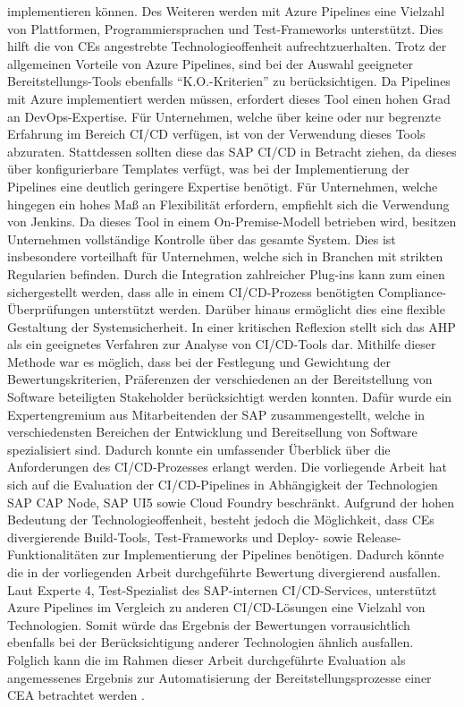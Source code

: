implementieren können. Des Weiteren werden mit Azure Pipelines eine Vielzahl von Plattformen, Programmiersprachen und Test-Frameworks unterstützt. Dies hilft die von CEs angestrebte Technologieoffenheit aufrechtzuerhalten. Trotz der allgemeinen Vorteile von Azure Pipelines, sind bei der Auswahl geeigneter Bereitstellungs-Tools ebenfalls \enquote{K.O.-Kriterien} zu berücksichtigen. Da Pipelines mit Azure implementiert werden müssen, erfordert dieses Tool einen hohen Grad an DevOps-Expertise. Für Unternehmen, welche über keine oder nur begrenzte Erfahrung im Bereich CI/CD verfügen, ist von der Verwendung dieses Tools abzuraten. Stattdessen sollten diese das SAP CI/CD in Betracht ziehen, da dieses über konfigurierbare Templates verfügt, was bei der Implementierung der Pipelines eine deutlich geringere Expertise benötigt. Für Unternehmen, welche hingegen ein hohes Maß an Flexibilität erfordern, empfiehlt sich die Verwendung von Jenkins. Da dieses Tool in einem On-Premise-Modell betrieben wird, besitzen Unternehmen vollständige Kontrolle über das gesamte System. Dies ist insbesondere vorteilhaft für Unternehmen, welche sich in Branchen mit strikten Regularien befinden. Durch die Integration zahlreicher Plug-ins kann zum einen sichergestellt werden, dass alle in einem CI/CD-Prozess benötigten Compliance-Überprüfungen unterstützt werden. Darüber hinaus ermöglicht dies eine flexible Gestaltung der Systemsicherheit. In einer kritischen Reflexion stellt sich das AHP als ein geeignetes Verfahren zur Analyse von CI/CD-Tools dar. Mithilfe dieser Methode war es möglich, dass bei der Festlegung und Gewichtung der Bewertungskriterien, Präferenzen der verschiedenen an der Bereitstellung von Software beteiligten Stakeholder berücksichtigt werden konnten. Dafür wurde ein Expertengremium aus Mitarbeitenden der SAP zusammengestellt, welche in verschiedensten Bereichen der Entwicklung und Bereitsellung von Software spezialisiert sind. Dadurch konnte ein umfassender Überblick über die Anforderungen des CI/CD-Prozesses erlangt werden. Die vorliegende Arbeit hat sich auf die Evaluation der CI/CD-Pipelines in Abhängigkeit der Technologien SAP CAP Node, SAP UI5 sowie Cloud Foundry beschränkt. Aufgrund der hohen Bedeutung der Technologieoffenheit, besteht jedoch die Möglichkeit, dass CEs divergierende Build-Tools, Test-Frameworks und Deploy- sowie Release-Funktionalitäten zur Implementierung der Pipelines benötigen. Dadurch könnte die in der vorliegenden Arbeit durchgeführte Bewertung divergierend ausfallen. Laut Experte 4, Test-Spezialist des SAP-internen CI/CD-Services, unterstützt Azure Pipelines im Vergleich zu anderen CI/CD-Lösungen eine Vielzahl von Technologien. Somit würde das Ergebnis der Bewertungen vorrausichtlich ebenfalls bei der Berücksichtigung anderer Technologien ähnlich ausfallen. Folglich kann die im Rahmen dieser Arbeit durchgeführte Evaluation als angemessenes Ergebnis zur Automatisierung der Bereitstellungsprozesse einer CEA betrachtet werden \cite[Z. 59 ff.]{TestDeveloperSAPHyperspaceAdoption&Onboarding.}.

